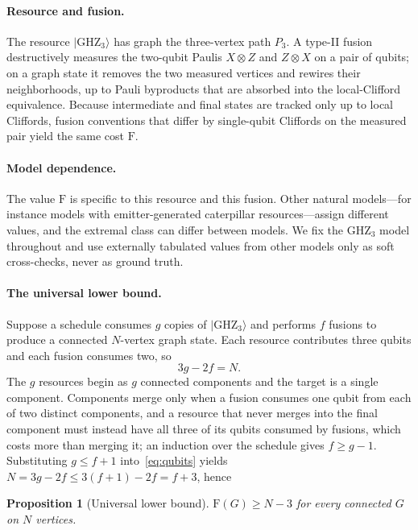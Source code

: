 \documentclass[11pt]{article}
\newtheorem{proposition}[theorem]{Proposition}
\theoremstyle{definition}
\theoremstyle{remark}
\newcommand{\F}{\mathrm{F}}
\newcommand{\GHZ}{\mathrm{GHZ}_3}
\newcommand{\N}{N}
\begin{document}
\paragraph{Resource and fusion.} The resource $|\GHZ\rangle$ has graph the three-vertex path $P_3$.
A type-II fusion destructively measures the two-qubit Paulis $X\otimes Z$ and $Z\otimes X$ on a
pair of qubits; on a graph state it removes the two measured vertices and rewires their
neighborhoods, up to Pauli byproducts that are absorbed into the local-Clifford equivalence.
Because intermediate and final states are tracked only up to local Cliffords, fusion conventions
that differ by single-qubit Cliffords on the measured pair yield the same cost $\F$.

\paragraph{Model dependence.} The value $\F$ is specific to this resource and this fusion. Other
natural models---for instance models with emitter-generated caterpillar resources---assign
different values, and the extremal class can differ between models. We fix the $\GHZ$ model
throughout and use externally tabulated values from other models only as soft cross-checks, never
as ground truth.

\paragraph{The universal lower bound.} Suppose a schedule consumes $g$ copies of $|\GHZ\rangle$ and
performs $f$ fusions to produce a connected $\N$-vertex graph state. Each resource contributes
three qubits and each fusion consumes two, so
\begin{equation}\label{eq:qubits}
  3g-2f=\N.
\end{equation}
The $g$ resources begin as $g$ connected components and the target is a single component.
Components merge only when a fusion consumes one qubit from each of two distinct components, and a
resource that never merges into the final component must instead have all three of its qubits
consumed by fusions, which costs more than merging it; an induction over the schedule gives
$f\ge g-1$. Substituting $g\le f+1$ into~\eqref{eq:qubits} yields
$\N=3g-2f\le 3(f+1)-2f=f+3$, hence

\begin{proposition}[Universal lower bound]\label{prop:lb}
$\F(G)\ge \N-3$ for every connected $G$ on $\N$ vertices.
\end{proposition}
\end{document}
